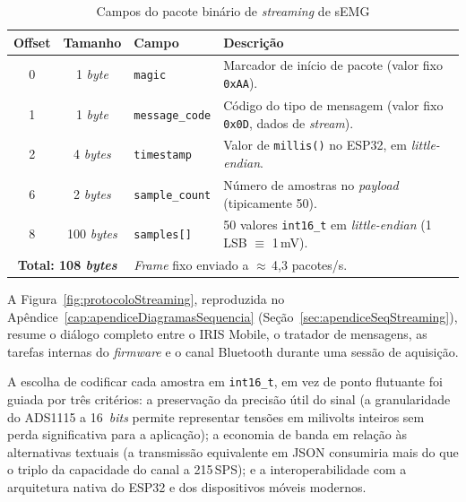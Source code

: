 \begin{table}[htb]
    \centering
    \caption{Campos do pacote binário de \textit{streaming} de sEMG}\label{tab:campos-pacote-binario}
    \begin{tabular}{|c|c|l|p{6cm}|}
        \hline
        \textbf{Offset} & \textbf{Tamanho} & \textbf{Campo} & \textbf{Descrição} \\
        \hline
        0 & 1 \textit{byte} & \texttt{magic} & Marcador de início de pacote (valor fixo \texttt{0xAA}). \\
        \hline
        1 & 1 \textit{byte} & \texttt{message\_code} & Código do tipo de mensagem (valor fixo \texttt{0x0D}, dados de \textit{stream}). \\
        \hline
        2 & 4 \textit{bytes} & \texttt{timestamp} & Valor de \texttt{millis()} no ESP32, em \textit{little-endian}. \\
        \hline
        6 & 2 \textit{bytes} & \texttt{sample\_count} & Número de amostras no \textit{payload} (tipicamente 50). \\
        \hline
        8 & 100 \textit{bytes} & \texttt{samples[]} & 50 valores \texttt{int16\_t} em \textit{little-endian} (1\,LSB $\equiv$ 1\,mV). \\
        \hline
        \multicolumn{2}{|c|}{\textbf{Total: 108 \textit{bytes}}} & \multicolumn{2}{l|}{\textit{Frame} fixo enviado a $\approx$\,4,3 pacotes/s.} \\
        \hline
    \end{tabular}
    \fonte{}
\end{table}

A Figura~\ref{fig:protocoloStreaming}, reproduzida no Apêndice~\ref{cap:apendiceDiagramasSequencia} (Seção~\ref{sec:apendiceSeqStreaming}), resume o diálogo completo entre o IRIS Mobile, o tratador de mensagens, as tarefas internas do \textit{firmware} e o canal Bluetooth durante uma sessão de aquisição.

A escolha de codificar cada amostra em \texttt{int16\_t}, em vez de ponto flutuante foi guiada por três critérios: a preservação da precisão útil do sinal (a granularidade do ADS1115 a 16~\textit{bits} permite representar tensões em milivolts inteiros sem perda significativa para a aplicação); a economia de banda em relação às alternativas textuais (a transmissão equivalente em JSON consumiria mais do que o triplo da capacidade do canal a 215\,SPS); e a interoperabilidade com a arquitetura nativa do ESP32 e dos dispositivos móveis modernos.

